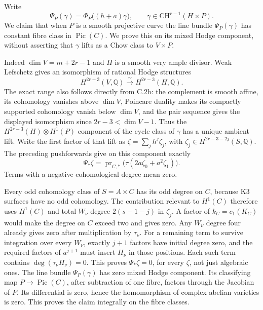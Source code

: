 Write
\[
 \Psi_P(\gamma)=\Phi_P\bigl((h+a)\gamma\bigr),
 \qquad \gamma\in\mathrm{CH}^{r-1}(H\times P).
\]
We claim that when $P$ is a smooth projective curve the line
bundle $\Psi_P(\gamma)$ has constant fibre class in
$\operatorname{Pic}(C)$. We prove this on its mixed Hodge
component, without asserting that $\gamma$ lifts as a Chow
class to $V\times P$.

Indeed $\dim V=m+2r-1$ and $H$ is a smooth very ample
divisor. Weak Lefschetz gives an isomorphism of rational
Hodge structures
\[
 H^{2r-3}(V,\mathbb Q)\xrightarrow{\ \sim\ }
 H^{2r-3}(H,\mathbb Q).
\]
The exact range also follows directly from C.2b: the complement
is smooth affine, its cohomology vanishes above $\dim V$,
Poincare duality makes its compactly supported cohomology
vanish below $\dim V$, and the pair sequence gives the
displayed isomorphism since $2r-3<\dim V-1$.
Thus the $H^{2r-3}(H)\otimes H^1(P)$ component of the
cycle class of $\gamma$ has a unique ambient lift. Write the
first factor of that lift as
$\zeta=\sum_j h^j\zeta_j$, with
$\zeta_j\in H^{2r-3-2j}(S,\mathbb Q)$. The preceding
pushforwards give on this component exactly
\[
 \Psi_*\zeta
   =\operatorname{pr}_{C,*}
                 \bigl(\tau(2a\zeta_0+a^2\zeta_1)\bigr).
\]
Terms with a negative cohomological degree mean zero.

Every odd cohomology class of $S=A\times C$ has its odd
degree on $C$, because K3 surfaces have no odd cohomology.
The contribution relevant to $H^1(C)$ therefore uses
$H^1(C)$ and total $W_\nu$ degree $2(s-1-j)$ in
$\zeta_j$. A factor of $k_C=c_1(K_C)$ would make the degree
on $C$ exceed two and gives zero. Any $W_\nu$ degree four
already gives zero after multiplication by $\tau_\nu$.
For a remaining term to survive integration over every
$W_\nu$, exactly $j+1$ factors have initial degree zero,
and the required factors of $a^{j+1}$ must insert $H_\nu$
in those positions. Each such term contains
$\deg(\tau_\nu H_\nu)=0$. This proves
$\Psi_*\zeta=0$, for every $\zeta$, not just algebraic ones.
The line bundle $\Psi_P(\gamma)$ has zero mixed Hodge
component. Its classifying map $P\to\operatorname{Pic}(C)$,
after subtraction of one fibre, factors through the Jacobian
of $P$. Its differential is zero, hence the homomorphism of
complex abelian varieties is zero. This proves the claim
integrally on the fibre classes.

